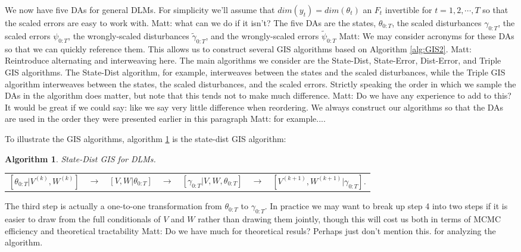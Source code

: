 \documentclass{article}
\newtheorem{alg}{Algorithm}
\newcommand{\matt}[1]{{\color{red} Matt: #1}}
\begin{document}
We now have five DAs for general DLMs. For simplicity we'll assume that $dim(y_t)=dim(\theta_t)$ an $F_t$ invertible for $t=1,2,\cdots,T$ so that the scaled errors are easy to work with. \matt{what can we do if it isn't?} The five DAs are the states, $\theta_{0:T}$, the scaled disturbances $\gamma_{0:T}$, the scaled errors $\psi_{0:T}$, the wrongly-scaled disturbances $\tilde{\gamma}_{0:T}$, and the wrongly-scaled errors $\tilde{\psi}_{0:T}$ \matt{We may consider acronyms for these DAs so that we can quickly reference them.} This allows us to construct several GIS algorithms based on Algorithm \ref{alg:GIS2}. \matt{Reintroduce alternating and interweaving here.} The main algorithms we consider are the State-Dist, State-Error, Dist-Error, and Triple GIS algorithms. The State-Dist algorithm, for example, interweaves between the states and the scaled disturbances, while the Triple GIS algorithm interweaves between the states, the scaled disturbances, and the scaled errors. Strictly speaking the order in which we sample the DAs in the algorithm does matter, but  note that this tends not to make much difference. \matt{Do we have any experience to add to this? It would be great if we could say: like \citeasnoun{yu2011center} we say very little difference when reordering.} We always construct our algorithms so that the DAs are used in the order they were presented earlier in this paragraph \matt{for example...}.

To illustrate the GIS algorithms, algorithm \ref{alg:SDint} is the state-dist GIS algorithm:
\begin{alg}State-Dist GIS for DLMs.\label{alg:SDint}\\
  \begin{center}
    \begin{tabular}{lllllll}
      $[\theta_{0:T}|V^{(k)},W^{(k)}]$&$\to$&$ [V,W|\theta_{0:T}]$&$\to$&$ [\gamma_{0:T}|V,W,\theta_{0:T}]$&$ \to $&$[V^{(k+1)},W^{(k+1)}|\gamma_{0:T}]$.
    \end{tabular}
  \end{center}
\end{alg}
\noindent \matt{Explain all steps.}
The third step is actually a one-to-one transformation from $\theta_{0:T}$ to $\gamma_{0:T}$.  In practice we may want to break up step 4 into two steps if it is easier to draw from the full conditionals of $V$ and $W$ rather than drawing them jointly, though this will cost us both in terms of MCMC efficiency and theoretical tractability \matt{Do we have much for theoretical resuls? Perhaps just don't mention this.} for analyzing the algorithm. 
\end{document}
